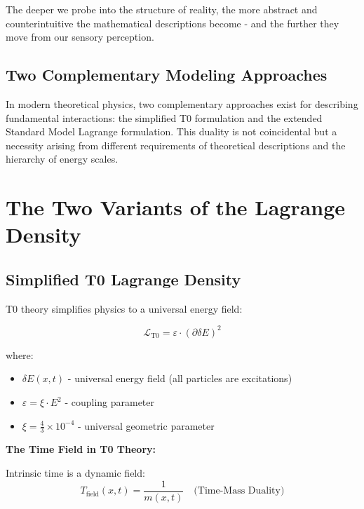 	The deeper we probe into the structure of reality, the more abstract and counterintuitive the mathematical descriptions become - and the further they move from our sensory perception.
	
	\subsection{Two Complementary Modeling Approaches}
	
	In modern theoretical physics, two complementary approaches exist for describing fundamental interactions: the simplified T0 formulation and the extended Standard Model Lagrange formulation. This duality is not coincidental but a necessity arising from different requirements of theoretical descriptions and the hierarchy of energy scales.
	
	\section{The Two Variants of the Lagrange Density}
	
	\subsection{Simplified T0 Lagrange Density}
	
	T0 theory simplifies physics to a universal energy field:
	
	\begin{t0box}
		\begin{equation}
			\mathcal{L}_{\text{T0}} = \varepsilon \cdot (\partial\delta E)^2
		\end{equation}
		
		where:
		\begin{itemize}
			\item $\delta E(x,t)$ - universal energy field (all particles are excitations)
			\item $\varepsilon = \xi \cdot E^2$ - coupling parameter
			\item $\xi = \frac{4}{3} \times 10^{-4}$ - universal geometric parameter
		\end{itemize}
	\end{t0box}
	
	\textbf{The Time Field in T0 Theory:}
	
	Intrinsic time is a dynamic field:
	\begin{equation}
		T_{\text{field}}(x,t) = \frac{1}{m(x,t)} \quad \text{(Time-Mass Duality)}
	\end{equation}
	
